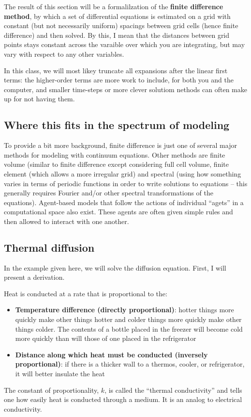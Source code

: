 \documentclass[a4paper,10pt]{scrartcl}
\begin{document}
The result of this section will be a formalilzation of the \textbf{finite difference method}, by which a set of differential equations is estimated on a grid with constant (but not necessarily uniform) spacings between grid cells (hence finite difference) and then solved. By this, I mean that the distances between grid points stays constant across the varaible over which you are integrating, but may vary with respect to any other variables.

In this class, we will most likey truncate all expansions after the linear first terms: the higher-order terms are more work to include, for both you and the computer, and smaller time-steps or more clever solutiom nethods can often make up for not having them.

\subsection{Where this fits in the spectrum of modeling}

To provide a bit more background, finite difference is just one of several major methods for modeling with continuum equations. Other methods are finite volume (similar to finite difference except considering full cell volume, finite element (which allows a more irregular grid) and spectral (using how something varies in terms of periodic functions in order to write solutions to equations -- this generally requires Fourier and/or other spectral transformations of the equations). Agent-based models that follow the actions of individual ``agets'' in a computational space also exist. These agents are often given simple rules and then allowed to interact with one another.

\subsection{Thermal diffusion}

In the example given here, we will solve the diffusion equation. First, I will present a derivation.

Heat is conducted at a rate that is proportional to the:
\begin{itemize}
 \item \textbf{Temperature difference (directly proportional)}: hotter things more quickly make other things hotter and colder things more quickly make other things colder. The contents of a bottle placed in the freezer will become cold more quickly than will those of one placed in the refrigerator
 \item \textbf{Distance along which heat must be conducted (inversely proportional)}: if there is a thicker wall to a thermos, cooler, or refrigerator, it will better insulate the heat
\end{itemize}
The constant of proportionality, $k$, is called the ``thermal conductivity'' and tells one how easily heat is conducted through a medium. It is an analog to electrical conductivity.
\end{document}
